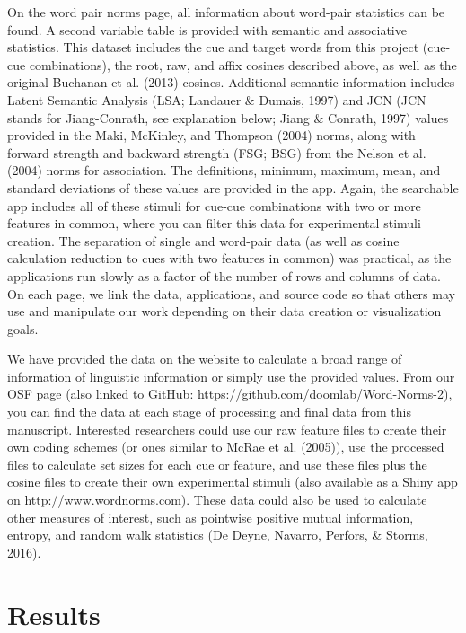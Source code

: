 \documentclass[english,,man]{apa6}
\begin{document}
On the word pair norms page, all information about word-pair statistics can be found. A second variable table is provided with semantic and associative statistics. This dataset includes the cue and target words from this project (cue-cue combinations), the root, raw, and affix cosines described above, as well as the original Buchanan et al. (2013) cosines. Additional semantic information includes Latent Semantic Analysis (LSA; Landauer \& Dumais, 1997) and JCN (JCN stands for Jiang-Conrath, see explanation below; Jiang \& Conrath, 1997) values provided in the Maki, McKinley, and Thompson (2004) norms, along with forward strength and backward strength (FSG; BSG) from the Nelson et al. (2004) norms for association. The definitions, minimum, maximum, mean, and standard deviations of these values are provided in the app. Again, the searchable app includes all of these stimuli for cue-cue combinations with two or more features in common, where you can filter this data for experimental stimuli creation. The separation of single and word-pair data (as well as cosine calculation reduction to cues with two features in common) was practical, as the applications run slowly as a factor of the number of rows and columns of data. On each page, we link the data, applications, and source code so that others may use and manipulate our work depending on their data creation or visualization goals.

We have provided the data on the website to calculate a broad range of information of linguistic information or simply use the provided values. From our OSF page (also linked to GitHub: \url{https://github.com/doomlab/Word-Norms-2}), you can find the data at each stage of processing and final data from this manuscript. Interested researchers could use our raw feature files to create their own coding schemes (or ones similar to McRae et al. (2005)), use the processed files to calculate set sizes for each cue or feature, and use these files plus the cosine files to create their own experimental stimuli (also available as a Shiny app on \url{http://www.wordnorms.com}). These data could also be used to calculate other measures of interest, such as pointwise positive mutual information, entropy, and random walk statistics (De Deyne, Navarro, Perfors, \& Storms, 2016).

\hypertarget{results}{%
\section{Results}\label{results}}
\end{document}
